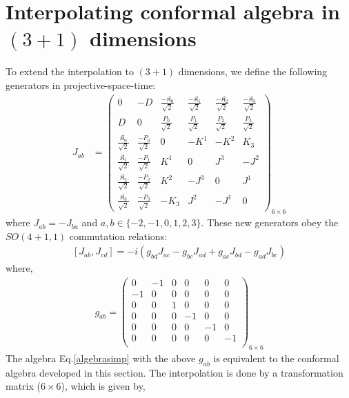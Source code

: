 \documentclass[journal,article,submit,pdftex,moreauthors]{Definitions/mdpi}
\begin{document}
\section{Interpolating conformal algebra in \texorpdfstring{$(3+1)$}{Lg} dimensions}
\label{conformalsimpler}
To extend the interpolation to \texorpdfstring{$(3+1)$}{Lg} dimensions, we define the following generators \cite{Francesco,Blumenhagen} in projective-space-time:
\begin{align}\label{Jab}
  J_{ab}&=
  \begin{pmatrix}
  0&-D&\frac{-\mathfrak{K}_0}{\sqrt{2}}&\frac{-\mathfrak{K}_1}{\sqrt{2}}&\frac{-\mathfrak{K}_2}{\sqrt{2}}&\frac{-\mathfrak{K}_3}{\sqrt{2}}\\
  D&0&\frac{P_0}{\sqrt{2}}&\frac{P_1}{\sqrt{2}}&\frac{P_2}{\sqrt{2}}&\frac{P_3}{\sqrt{2}}\\
    \frac{\mathfrak{K}_0}{\sqrt{2}}&\frac{-P_0}{\sqrt{2}}&0 & -K^{1} & -K^{2} & K_3\\
    \frac{\mathfrak{K}_1}{\sqrt{2}}&\frac{-P_1}{\sqrt{2}}&K^{1} & 0 & J^{3} & -J^{2}\\
    \frac{\mathfrak{K}_2}{\sqrt{2}}&\frac{-P_2}{\sqrt{2}}&K^{2} & -J^{3} & 0 & J^{1}\\
    \frac{\mathfrak{K}_3}{\sqrt{2}}&\frac{-P_3}{\sqrt{2}}&-K_3 & J^{2} & -J^{1} & 0
  \end{pmatrix}_{6\times6}
\end{align}
where $J_{ab}=-J_{ba}$ and $a,b\in\{-2,-1,0,1,2,3\}$. These new generators obey the $SO(4+1,1)$ commutation relations:
  \begin{align}\label{algebrasimp}
      \left[J_{{a}{b}},J_{{c}{d}}\right]=-i\left(g_{{b}{d}}J_{{a}{c}}-g_{{b}{c}}J_{{a}{d}}+g_{{a}{c}}J_{{b}{d}}-g_{{a}{d}}J_{{b}{c}}\right)
  \end{align}
where, 
  \begin{align}\label{metric}
      g_{ab}=\begin{pmatrix}
  0&-1&0&0&0&0\\
  -1&0&0&0&0&0\\
  0&0&1&0&0&0\\
  0&0&0&-1&0&0\\
  0&0&0&0&-1&0\\
  0&0&0&0&0&-1\\
  \end{pmatrix}_{6\times6}
  \end{align}
The algebra Eq.\eqref{algebrasimp} with the above $g_{ab}$ is equivalent to the conformal algebra developed in this section. The interpolation is done by a transformation matrix ($6\times6$), which is given by,
\end{document}
